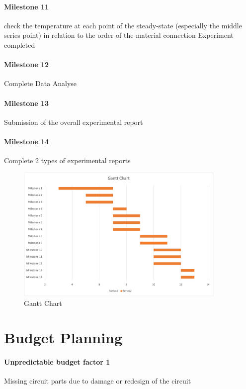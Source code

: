 \documentclass[a4paper,12pt]{article}
\begin{document}
\paragraph{Milestone 11} check the temperature at each point of the steady-state (especially the middle series point) in relation to the order of the material connection Experiment completed
\paragraph{Milestone 12}Complete Data Analyse
\paragraph{Milestone 13} Submission of the overall experimental report
\paragraph{Milestone 14} Complete 2 types of experimental reports

\begin{figure}[H] %
\centering %
\includegraphics[width=0.9\textwidth]{Gantt.png} %
\caption{Gantt Chart} %
\end{figure}


\section{Budget Planning}

\paragraph{Unpredictable budget factor 1} Missing circuit parts due to damage or redesign of the circuit
\end{document}
